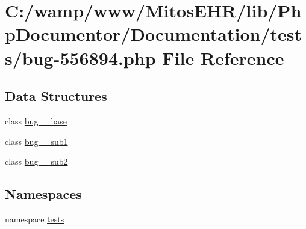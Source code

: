\hypertarget{bug-556894_8php}{\section{\-C\-:/wamp/www/\-Mitos\-E\-H\-R/lib/\-Php\-Documentor/\-Documentation/tests/bug-\/556894.php \-File \-Reference}
\label{bug-556894_8php}
}
\subsection*{\-Data \-Structures}
\begin{DoxyCompactItemize}
\item 
class \hyperlink{classbug__556894__base}{bug\-\_\-\_\-base}
\item 
class \hyperlink{classbug__556894__sub1}{bug\-\_\-\_\-sub1}
\item 
class \hyperlink{classbug__556894__sub2}{bug\-\_\-\_\-sub2}
\end{DoxyCompactItemize}
\subsection*{\-Namespaces}
\begin{DoxyCompactItemize}
\item 
namespace \hyperlink{namespacetests}{tests}
\end{DoxyCompactItemize}

